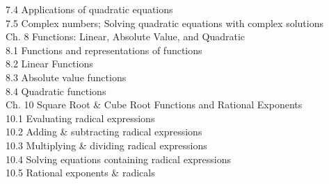 \documentclass{ximera}
\begin{document}
7.4 Applications of quadratic equations\\
7.5 Complex numbers; Solving quadratic equations with complex solutions\\
Ch. 8 Functions: Linear, Absolute Value, and Quadratic\\
8.1 Functions and representations of functions\\
8.2 Linear Functions\\
8.3 Absolute value functions\\
8.4 Quadratic functions\\
Ch. 10 Square Root \& Cube Root Functions and Rational Exponents\\
10.1 Evaluating radical expressions\\
10.2 Adding \& subtracting radical expressions\\
10.3 Multiplying \& dividing radical expressions\\
10.4 Solving equations containing radical expressions\\
10.5 Rational exponents \& radicals
\end{document}
